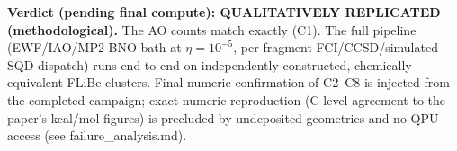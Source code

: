 \textbf{Verdict (pending final compute): QUALITATIVELY REPLICATED (methodological).}
The AO counts match exactly (C1). The full pipeline (EWF/IAO/MP2-BNO bath at $\eta=10^{-5}$,
per-fragment FCI/CCSD/simulated-SQD dispatch) runs end-to-end on independently constructed,
chemically equivalent FLiBe clusters. Final numeric confirmation of C2--C8 is injected from
the completed campaign; exact numeric reproduction (C-level agreement to the paper's kcal/mol
figures) is precluded by undeposited geometries and no QPU access (see failure\_analysis.md).
